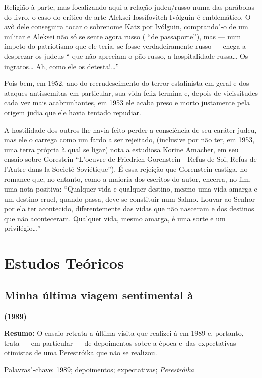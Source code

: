 Religião à parte, mas focalizando aqui a relação judeu/russo numa das
parábolas do livro, o caso do crítico de arte Aleksei Iossífovitch
Ivólguin é emblemático. O avô dele conseguira tocar o sobrenome Katz por
Ivólguin, comprando"-o de um militar e Aleksei não só se sente agora
russo ( ``de passaporte''), mas --- num ímpeto do patriotismo que ele
teria, se fosse verdadeiramente russo --- chega a desprezar os judeus
`` que não apreciam o pão russo, a hospitalidade russa\ldots{} Os ingratos\ldots{}
Ah, como ele os detesta!\ldots{}''

Pois bem, em 1952, ano do recrudescimento do terror estalinista em geral
e dos ataques antissemitas em particular, sua vida feliz termina e,
depois de vicissitudes cada vez mais acabrunhantes, em 1953 ele acaba
preso e morto justamente pela origem judia que ele havia tentado
repudiar.

A hostilidade dos outros lhe havia feito perder a consciência de seu
caráter judeu, mas ele o carrega como um fardo a ser rejeitado,
(inclusive por não ter, em 1953, uma terra própria à qual se ligar( nota
a estudiosa Korine Amacher, em seu ensaio sobre Gorestein ``L'oeuvre de
Friedrich Gorenstein - Refus de Soi, Refus de l'Autre dans la Societé
Soviétique''). É essa rejeição que Gorenstein castiga, no romance que, no entanto, como a maioria dos escritos do autor, encerra,
no fim, uma nota positiva: ``Qualquer vida e qualquer destino, mesmo uma
vida amarga e um destino cruel, quando passa, deve se constituir num
Salmo. Louvar ao Senhor por ela ter acontecido, diferentemente das vidas
que não nasceram e dos destinos que não aconteceram. Qualquer vida,
mesmo amarga, é uma sorte e um privilégio\ldots{}''

\part{Estudos Teóricos}

\chapter{Minha última viagem sentimental à }

\textbf{(1989)}

\textbf{Resumo:} O ensaio retrata a última visita que realizei à  em
1989 e, portanto, trata --- em particular --- de depoimentos sobre a época
e~das expectativas otimistas de uma Perestróika que não se realizou.

Palavras"-chave: 1989; depoimentos; expectativas; \emph{Perestróika}

